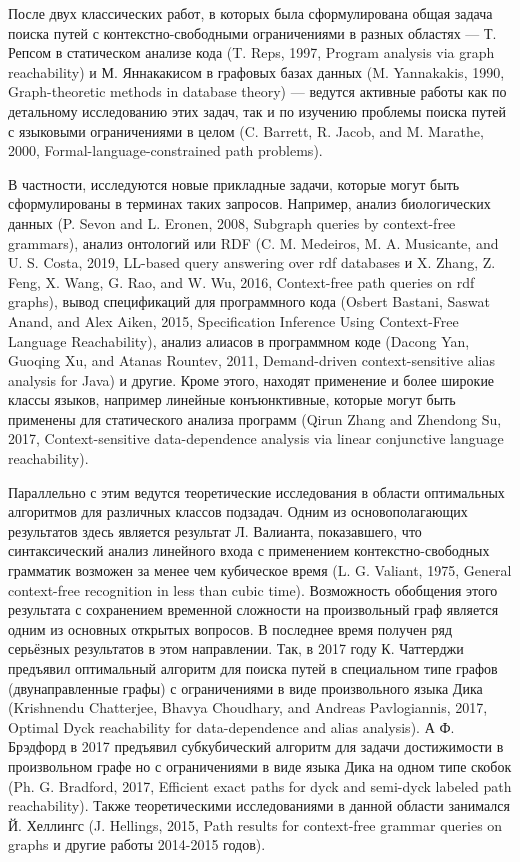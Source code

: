 \documentclass[12pt]{article}  %
\theoremstyle{remark}
\begin{document}
После двух классических работ, в которых была сформулирована общая задача поиска путей с контекстно-свободными ограничениями в разных областях --- Т. Репсом в статическом анализе кода (T. Reps, 1997, Program analysis via graph reachability) и М. Яннакакисом в графовых базах данных (M. Yannakakis, 1990, Graph-theoretic methods in database theory) --- ведутся активные работы как по детальному исследованию этих задач, так и по изучению проблемы поиска путей с языковыми ограничениями в целом (C. Barrett, R. Jacob, and M. Marathe, 2000, Formal-language-constrained path problems).

В частности, исследуются новые прикладные задачи, которые могут быть сформулированы в терминах таких запросов. Например, анализ биологических данных (P. Sevon and L. Eronen, 2008, Subgraph queries by context-free grammars), анализ онтологий или RDF (C. M. Medeiros, M. A. Musicante, and U. S. Costa, 2019, LL-based query answering over rdf databases и X. Zhang, Z. Feng, X. Wang, G. Rao, and W. Wu, 2016, Context-free path queries on rdf graphs), вывод спецификаций для программного кода (Osbert Bastani, Saswat Anand, and Alex Aiken, 2015, Specification Inference Using Context-Free Language Reachability), анализ алиасов в программном коде (Dacong Yan, Guoqing Xu, and Atanas Rountev, 2011, Demand-driven context-sensitive alias analysis for Java) и другие. Кроме этого, находят применение и более широкие классы языков, например линейные конъюнктивные, которые могут быть применены для статического анализа программ (Qirun Zhang and Zhendong Su, 2017, Context-sensitive data-dependence analysis via linear conjunctive language reachability).

Параллельно с этим ведутся теоретические исследования в области оптимальных алгоритмов для различных классов подзадач. Одним из основополагающих результатов здесь является результат Л. Валианта, показавшего, что синтаксический анализ линейного входа с применением контекстно-свободных грамматик возможен за менее чем кубическое время (L. G. Valiant, 1975, General context-free recognition in less than cubic time). Возможность обобщения этого результата с сохранением временной сложности на произвольный граф является одним из основных открытых вопросов. В последнее время получен ряд серьёзных результатов в этом направлении. Так, в 2017 году К. Чаттерджи предъявил оптимальный алгоритм для поиска путей в специальном типе графов (двунаправленные графы) с ограничениями в виде произвольного языка Дика (Krishnendu Chatterjee, Bhavya Choudhary, and Andreas Pavlogiannis, 2017, Optimal Dyck reachability for data-dependence and alias analysis). А Ф. Брэдфорд в 2017 предъявил субкубический алгоритм для задачи достижимости в произвольном графе но с ограничениями в виде языка Дика на одном типе скобок (Ph. G. Bradford, 2017, Efficient exact paths for dyck and semi-dyck labeled path reachability). Также теоретическими исследованиями в данной области занимался Й. Хеллингс (J. Hellings, 2015, Path results for context-free grammar queries on graphs и другие работы 2014-2015 годов).
\end{document}
